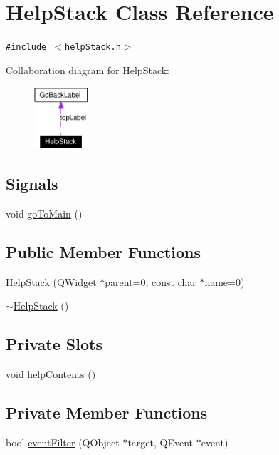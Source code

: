 \hypertarget{classHelpStack}{
\section{Help\-Stack Class Reference}
\label{classHelpStack}
}
{\tt \#include $<$help\-Stack.h$>$}

Collaboration diagram for Help\-Stack:\begin{figure}[H]
\begin{center}
\leavevmode
\includegraphics[width=57pt]{classHelpStack__coll__graph}
\end{center}
\end{figure}
\subsection*{Signals}
\begin{CompactItemize}
\item 
void \hyperlink{classHelpStack_l0}{go\-To\-Main} ()
\end{CompactItemize}
\subsection*{Public Member Functions}
\begin{CompactItemize}
\item 
\hyperlink{classHelpStack_a0}{Help\-Stack} (QWidget $\ast$parent=0, const char $\ast$name=0)
\item 
\hyperlink{classHelpStack_a1}{$\sim$Help\-Stack} ()
\end{CompactItemize}
\subsection*{Private Slots}
\begin{CompactItemize}
\item 
void \hyperlink{classHelpStack_k0}{help\-Contents} ()
\end{CompactItemize}
\subsection*{Private Member Functions}
\begin{CompactItemize}
\item 
bool \hyperlink{classHelpStack_d0}{event\-Filter} (QObject $\ast$target, QEvent $\ast$event)
\end{CompactItemize}
